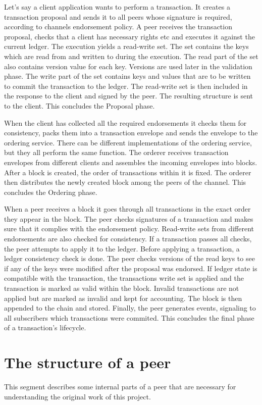 Let's say a client application wants to perform a transaction. It creates a transaction proposal and sends it to all peers whose signature is required, according to channels endorsement policy.
A peer receives the transaction proposal, checks that a client has necessary rights etc and executes it against the current ledger. The execution yields a read-write set. The set contains the keys which are read from and written to during the execution. The read part of the set also contains version value for each key. Versions are used later in the validation phase. The write part of the set contains keys and values that are to be written to commit the transaction to the ledger. The read-write set is then included in the response to the client and signed by the peer. The resulting structure is sent to the client. This concludes the Proposal phase.

When the client has collected all the required endorsements it checks them for consistency, packs them into a transaction envelope and sends the envelope to the ordering service. There can be different implementations of the ordering service, but they all perform the same function. The orderer receives transaction envelopes from different clients and assembles the incoming envelopes into blocks. After a  block is created, the order of transactions within it is fixed. The orderer then distributes the newly created block among the peers of the channel. This concludes the Ordering phase.

When a peer receives a block it goes through all transactions in the exact order they appear in the block. The peer checks signatures of a transaction and makes sure that it complies with the endorsement policy. Read-write sets from different endorsements are also checked for consistency. If a transaction passes all checks, the peer attempts to apply it to the ledger. Before applying a transaction, a ledger consistency check is done. The peer checks versions of the read keys to see if any of the keys were modified after the proposal was endorsed. If ledger state is compatible with the transaction, the transactions write set is applied and the transaction is marked as valid within the block. Invalid transactions are not applied but are marked as invalid and kept for accounting. The block is then appended to the chain and stored. Finally, the peer generates events, signaling to all subscribers which transactions were commited. This concludes the final phase of a transaction's lifecycle.

\section{The structure of a peer}
\label{sec:back-peer}
This segment describes some internal parts of a peer that are necessary for understanding the original work of this project.

